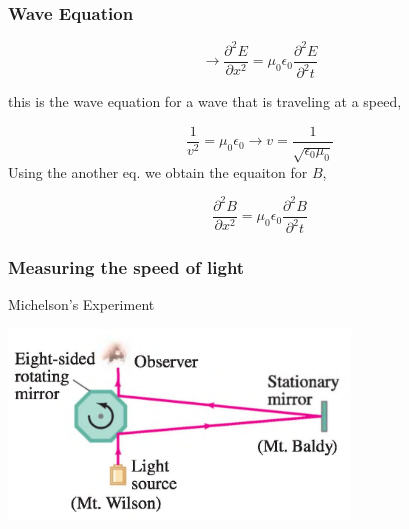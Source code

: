 \documentclass[]{beamer}
\begin{document}
\begin{frame}

\frametitle{Wave Equation}



\begin{equation}
\rightarrow \frac{\partial^2 E}{\partial x^2}=\mu_0\epsilon_0\frac{\partial^2 E}{\partial^2 t}
\end{equation}
\pause

this is the wave equation for a wave that is traveling at a speed,
\pause

\begin{equation*}
\frac{1}{v^2}=\mu_0\epsilon_0\rightarrow v=\frac{1}{\sqrt{\epsilon_0 \mu_0}}
\end{equation*}
\pause
Using the another eq. we obtain the equaiton for $B$,
\pause

\begin{equation}
\frac{\partial^2 B}{\partial x^2}=\mu_0\epsilon_0\frac{\partial^2 B}{\partial^2 t}
\end{equation}



  \end{frame}




\begin{frame}

\frametitle{Measuring the speed of light}

Michelson's Experiment

  \begin{center}
  \includegraphics[height=2.0in]{images5/Michelson.jpg}
\end{center}




  \end{frame}

\end{document}
